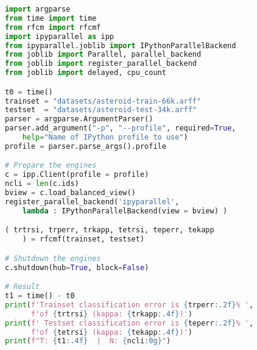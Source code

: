 \begin{lstlisting}[language=Python, caption={Parallel Cython implementation of the RF test case - Python main code.}]
import argparse
from time import time
from rfcm import rfcmf
import ipyparallel as ipp
from ipyparallel.joblib import IPythonParallelBackend
from joblib import Parallel, parallel_backend
from joblib import register_parallel_backend
from joblib import delayed, cpu_count

t0 = time()
trainset = "datasets/asteroid-train-66k.arff"
testset  = "datasets/asteroid-test-34k.arff"
parser = argparse.ArgumentParser()
parser.add_argument("-p", "--profile", required=True,
    help="Name of IPython profile to use")
profile = parser.parse_args().profile

# Prepare the engines
c = ipp.Client(profile = profile)
ncli = len(c.ids)
bview = c.load_balanced_view()
register_parallel_backend('ipyparallel',
    lambda : IPythonParallelBackend(view = bview) )

( trtrsi, trperr, trkapp, tetrsi, teperr, tekapp
    ) = rfcmf(trainset, testset)

# Shutdown the engines
c.shutdown(hub=True, block=False)

# Result
t1 = time() - t0
print(f'Trainset classification error is {trperr:.2f}% ',
      f'of {trtrsi} (kappa: {trkapp:.4f})')
print(f' Testset classification error is {teperr:.2f}% ',
      f'of {tetrsi} (kappa: {tekapp:.4f})')
print(f"T: {t1:.4f}  |  N: {ncli:0g}")
\end{lstlisting}




